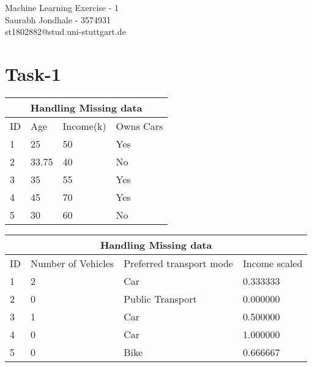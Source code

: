\documentclass{article}
\begin{document}
\begin{center}
    \huge Machine Learning Exercise - 1 
    \vspace{10px} 
    \\
    \Large Saurabh Jondhale - 3574931
    \\
    \Large st1802882@stud.uni-stuttgart.de
\end{center}

\section{Task-1}

 \begin{tabular}{ |p{1cm}|p{3cm}|p{3cm}|p{3cm}|  }
 \hline
 \multicolumn{4}{|c|}{Handling Missing data} \\
 \hline
 ID& Age &Income(k) &Owns Cars\\
 \hline
 1&25&50&Yes\\
 2&33.75&40&No\\
 3&35&55&Yes\\
 4&45&70&Yes\\
 5&30&60&No\\
 
 \hline
\end{tabular}
\newline
\noindent
\begin{tabular}{ |p{1cm}|p{3cm}|p{4cm}|p{3cm}|  }
    \hline
    \multicolumn{4}{|c|}{Handling Missing data} \\
    \hline
   ID& Number of Vehicles &Preferred transport mode  &Income scaled\\
    \hline
    1&2&Car&0.333333\\
    2&0&Public Transport&0.000000\\
    3&1&Car&0.500000\\
    4&0&Car&1.000000\\
    5&0&Bike&0.666667\\
    
    \hline
\end{tabular}
\end{document}

